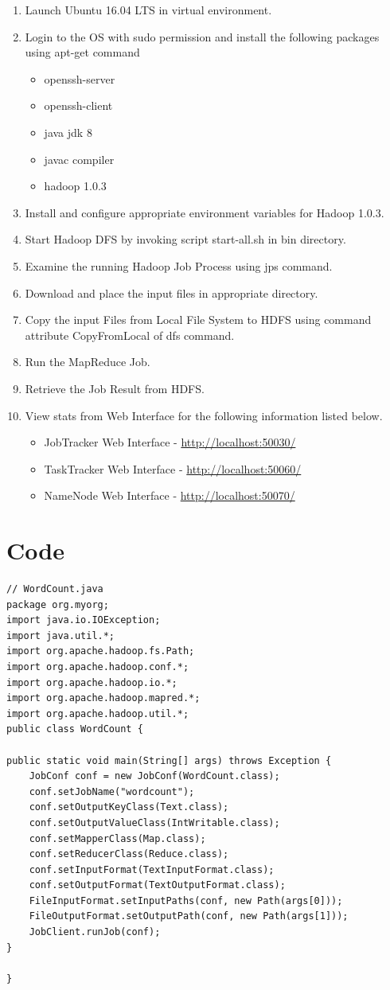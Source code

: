 \documentclass[a4paper,10pt]{article}
\begin{document}
\begin{enumerate}
	\item Launch Ubuntu 16.04 LTS in virtual environment.
	\item Login to the OS with sudo permission and install the following packages using apt-get command
	\begin{itemize}
		\item openssh-server
		\item openssh-client
		\item java jdk 8
		\item javac compiler
        \item hadoop 1.0.3
	\end{itemize}
\pagebreak
  \item Install and configure appropriate environment variables for Hadoop 1.0.3.
  \item Start Hadoop DFS by invoking script start-all.sh in bin directory.
  \item Examine the running Hadoop Job Process using jps command.
  \item Download and place the input files in appropriate directory.
  \item Copy the input Files from Local File System to HDFS using command attribute CopyFromLocal of dfs command.
  \item Run the MapReduce Job.
  \item Retrieve the Job Result from HDFS.
  \item View stats from Web Interface for the following information listed below.
  \begin{itemize}
  	\item JobTracker Web Interface - \url{http://localhost:50030/}
  	\item TaskTracker Web Interface - \url{http://localhost:50060/}
  	\item NameNode Web Interface - \url{http://localhost:50070/} 	
  \end{itemize}
  
\end{enumerate}
\section{Code}
\begin{lstlisting}
// WordCount.java
package org.myorg;
import java.io.IOException;
import java.util.*;
import org.apache.hadoop.fs.Path;
import org.apache.hadoop.conf.*;
import org.apache.hadoop.io.*;
import org.apache.hadoop.mapred.*;
import org.apache.hadoop.util.*;
public class WordCount {

public static void main(String[] args) throws Exception {
	JobConf conf = new JobConf(WordCount.class);
	conf.setJobName("wordcount");
	conf.setOutputKeyClass(Text.class);
	conf.setOutputValueClass(IntWritable.class);
	conf.setMapperClass(Map.class);
	conf.setReducerClass(Reduce.class);
	conf.setInputFormat(TextInputFormat.class);
	conf.setOutputFormat(TextOutputFormat.class);
	FileInputFormat.setInputPaths(conf, new Path(args[0]));
	FileOutputFormat.setOutputPath(conf, new Path(args[1]));
	JobClient.runJob(conf);
}

}
\end{lstlisting}
\end{document}
